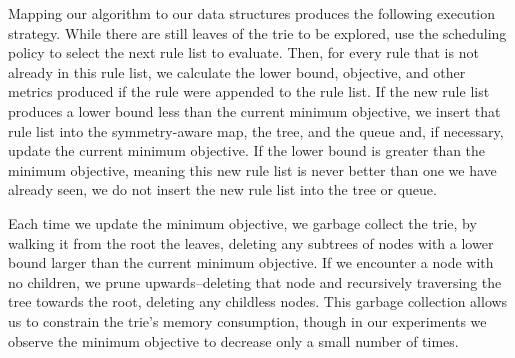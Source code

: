 Mapping our algorithm to our data structures produces the following execution strategy.
While there are still leaves of the trie to be explored, use the scheduling policy to select
the next rule list to evaluate.
Then, for every rule that is not already in this rule list, we calculate the lower bound,
objective, and other metrics produced if the rule were appended to the rule list.
If the new rule list produces a lower bound less than the current minimum objective, we insert that
rule list into the symmetry-aware map, the tree, and the queue and, if necessary, update the
current minimum objective.
If the lower bound is greater than the minimum objective, meaning this new rule list is never
better than one we have already seen, we do not insert the new rule list into the tree or queue. 

Each time we update the minimum objective, we garbage collect the trie, by walking it
from the root the leaves, deleting any subtrees of nodes with a lower bound larger than the current
minimum objective. If we encounter a node with no children, we prune upwards--deleting that
node and recursively traversing the tree towards the root, deleting any childless nodes.
This garbage collection allows us to constrain the trie's memory consumption, though in our
experiments we observe the minimum objective to decrease only a small number of times.

